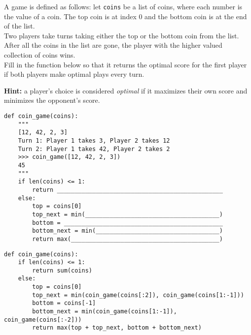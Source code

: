 \begin{blocksection}
\question A game is defined as follows: let \lstinline{coins} be a list of coins, where each number is the value of a coin.
The top coin is at index 0 and the bottom coin is at the end of the list.
\\
Two players take turns taking either the top or the bottom coin from the list.
After all the coins in the list are gone, the player with the higher valued collection of coins wins.
\\
Fill in the function below so that it returns the optimal score for the first player if both players make optimal plays every turn.

\textbf{Hint:} a player's choice is considered \textit{optimal} if it maximizes their own score and minimizes the opponent's score.  \\

\begin{lstlisting}
def coin_game(coins):
    """
    [12, 42, 2, 3]
    Turn 1: Player 1 takes 3, Player 2 takes 12
    Turn 2: Player 1 takes 42, Player 2 takes 2
    >>> coin_game([12, 42, 2, 3])
    45
    """
    if len(coins) <= 1:
        return _______________________________________________
    else:
        top = coins[0]
        top_next = min(______________________________________)
        bottom = _____________________________________________
        bottom_next = min(___________________________________)
        return max(__________________________________________)
\end{lstlisting}
\end{blocksection}

\begin{solution}[0in]
\begin{lstlisting}
def coin_game(coins):
    if len(coins) <= 1:
        return sum(coins)
    else:
        top = coins[0]
        top_next = min(coin_game(coins[:2]), coin_game(coins[1:-1]))
        bottom = coins[-1]
        bottom_next = min(coin_game(coins[1:-1]), coin_game(coins[:-2]))
        return max(top + top_next, bottom + bottom_next)
\end{lstlisting}
\end{solution}


